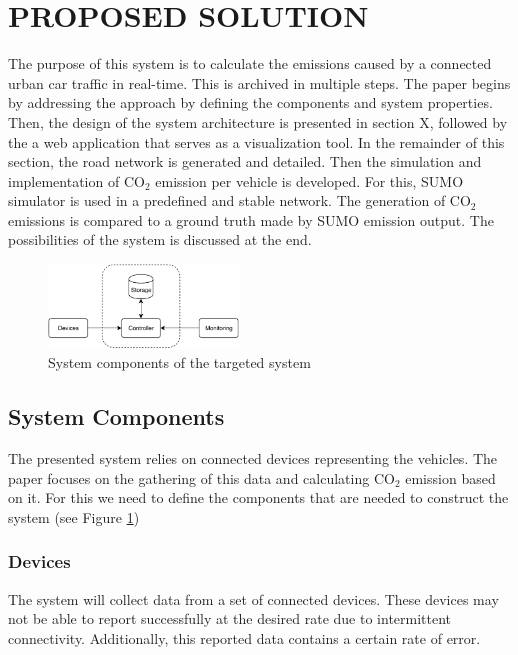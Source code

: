 \documentclass[letter, 10pt, conference]{ieeeconf}
\begin{document}
\section{PROPOSED SOLUTION}

The purpose of this system is to calculate the emissions caused by a connected urban car traffic in real-time.
This is archived in multiple steps.
The paper begins by addressing the approach by defining the components and system properties.
Then, the design of the system architecture is presented in section X, followed by the a web application that serves as a visualization tool.
In the remainder of this section, the road network is generated and detailed.
Then the simulation and implementation of CO$_2$ emission per vehicle is developed.
For this, SUMO simulator is used in a predefined and stable network.
The generation of CO$_2$ emissions is compared to a ground truth made by SUMO emission output.
The possibilities of the system is discussed at the end.

\begin{figure}[h]
  \centering
  \includegraphics[width=0.45\textwidth]{diagram1}
  \caption{System components of the targeted system}
  \label{fig:diagram1}
\end{figure}

\subsection{System Components}

The presented system relies on connected devices representing the vehicles.
The paper focuses on the gathering of this data and calculating CO$_2$ emission based on it.
For this we need to define the components that are needed to construct the system (see Figure \ref{fig:diagram1})

\subsubsection{Devices}

The system will collect data from a set of connected devices.
These devices may not be able to report successfully at the desired rate due to intermittent connectivity.
Additionally, this reported data contains a certain rate of error.
\end{document}
